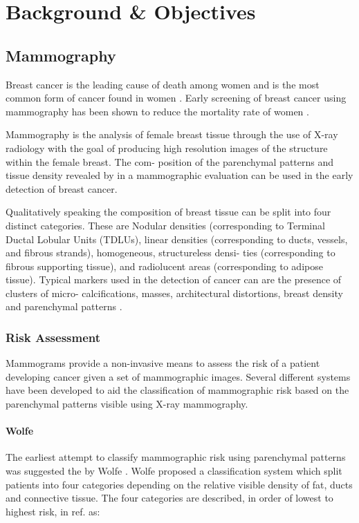 \chapter{Background \& Objectives}

\section{Mammography}

Breast cancer is the leading cause of death among women and is the most common form of cancer found in women \cite{siegel2014cancer}. Early screening of breast cancer using mammography has been shown to reduce the mortality rate of women \cite{independent2012benefits, smith2014cancer}.

Mammography is the analysis of female breast tissue through the use of X-ray radiology with the goal of producing high resolution images of the structure within the female breast. The com- position of the parenchymal patterns and tissue density revealed by in a mammographic evaluation can be used in the early detection of breast cancer.

Qualitatively speaking the composition of breast tissue can be split into four distinct categories. These are Nodular densities (corresponding to Terminal Ductal Lobular Units (TDLUs), linear densities (corresponding to ducts, vessels, and fibrous strands), homogeneous, structureless densi- ties (corresponding to fibrous supporting tissue), and radiolucent areas (corresponding to adipose tissue)\cite{tabar2005breast}. Typical markers used in the detection of cancer can are the presence of clusters of micro- calcifications, masses, architectural distortions, breast density and parenchymal patterns \cite{mccormack2006breast, sampat2005computer}.

\subsection{Risk Assessment}
Mammograms provide a non-invasive means to assess the risk of a patient developing cancer given a set of mammographic images. Several different systems have been developed to aid the classification of mammographic risk based on the parenchymal patterns visible using X-ray mammography.

\subsubsection{Wolfe}
The earliest attempt to classify mammographic risk using parenchymal patterns was suggested the by Wolfe \cite{wolfe1976breast}. Wolfe proposed a classification system which split patients into four categories depending on the relative visible density of fat, ducts and connective tissue. The four categories are described, in order of lowest to highest risk, in ref. \cite{wolfe1976breast} as:

